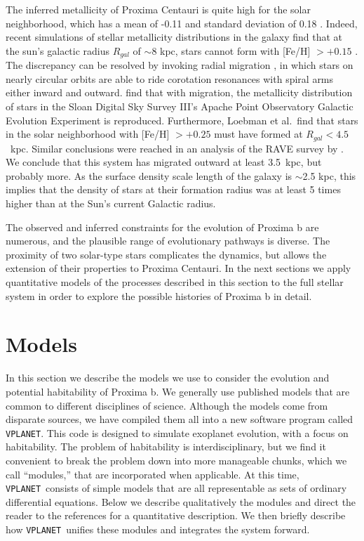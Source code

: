 \documentclass[preprint,12pt]{aastex}
\def\vplanet{\texttt{\footnotesize{VPLANET}}\xspace}
\begin{document}
The inferred metallicity of Proxima Centauri is quite high for the
solar neighborhood, which has a mean of -0.11 and standard deviation
of 0.18 \citep{AllendePrieto04}. Indeed, recent simulations of stellar
metallicity distributions in the galaxy find that at the sun's
galactic radius $R_{gal}$ of $\sim$8 kpc, stars cannot form with
[Fe/H] $> +0.15$ \citep{Loebman16}. The discrepancy can be resolved by
invoking radial migration \citep{SellwoodBinney02}, in which stars on
nearly circular orbits are able to ride corotation resonances with
spiral arms either inward and outward. \cite{Loebman16} find that with
migration, the metallicity distribution of stars in the Sloan Digital
Sky Survey III's Apache Point Observatory Galactic Evolution
Experiment \citep{Hayden15} is reproduced. Furthermore, Loebman et
al.\ find that stars in the solar neighborhood with [Fe/H] $> +0.25$
must have formed at $R_{gal} < 4.5$~kpc. Similar conclusions were
reached in an analysis of the RAVE survey by \cite{Kordopatis15}.  We
conclude that this system has migrated outward at least 3.5~kpc, but
probably more. As the surface density scale length of the galaxy is
$\sim$2.5 kpc, this implies that the density of stars at their
formation radius was at least 5 times higher than at the Sun's current
Galactic radius.

The observed and inferred constraints for the evolution of Proxima b
are numerous, and the plausible range of evolutionary pathways is
diverse. The proximity of two solar-type stars complicates the
dynamics, but allows the extension of their properties to Proxima
Centauri. In the next sections we apply quantitative models of the
processes described in this section to the full stellar system in order to
explore the possible histories of Proxima b in detail.

\section{Models\label{sec:models}}

In this section we describe the models we use to consider the
evolution and potential habitability of Proxima b. We generally use
published models that are common to different disciplines of
science. Although the models come from disparate sources, we have
compiled them all into a new software program called \vplanet. This
code is designed to simulate exoplanet evolution, with a focus on
habitability. The problem of habitability is interdisciplinary, but we
find it convenient to break the problem down into more manageable
chunks, which we call ``modules,'' that are incorporated when
applicable. At this time, \vplanet~consists of simple models that are
all representable as sets of ordinary differential equations. Below we
describe qualitatively the modules and direct the reader to the
references for a quantitative description. We then briefly describe
how \vplanet~unifies these modules and integrates the system forward.
\end{document}
